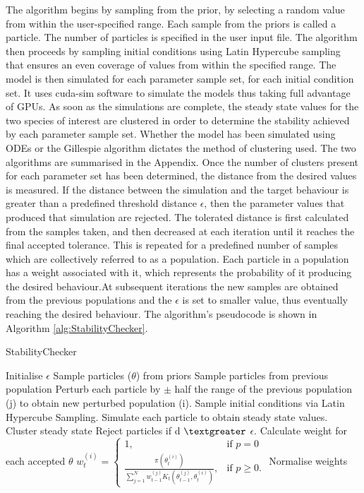  The algorithm begins by sampling from the prior, by selecting a random value from within the user-specified range. Each sample from the priors is called a particle. The number of particles is specified in the user input file. The algorithm then proceeds by sampling initial conditions using Latin Hypercube sampling that ensures an even coverage of values from within the specified range. The model is then simulated for each parameter sample set, for each initial condition set.  It uses cuda-sim software \autocite{Zhou:2011hp} to simulate the models thus taking full advantage of GPUs.  As soon as the simulations are complete, the steady state values for the two species of interest are clustered in order to determine the stability achieved by each parameter sample set. Whether the model has been simulated using ODEs or the Gillespie algorithm dictates the method of clustering used. The two algorithms are summarised in the Appendix. Once the number of clusters present for each parameter set has been determined, the distance from the desired values is measured. If the distance between the simulation and the target behaviour is greater than a predefined threshold distance $\epsilon$, then the parameter values that produced that simulation are rejected. The tolerated distance is first calculated from the samples taken, and then decreased at each iteration until it reaches the final accepted tolerance. This is repeated for a predefined number of samples which are collectively referred to as a population. Each particle in a population has a weight associated with it, which represents the probability of it producing the desired behaviour.At subsequent iterations the new samples are obtained from the previous populations and the $\epsilon$ is set to smaller value, thus eventually reaching the desired behaviour. The algorithm's pseudocode is shown in Algorithm \ref{alg:StabilityChecker}. 
\clearpage
\begin{algorithm}[ht]
	\label{alg:StabilityChecker}
  \caption{StabilityChecker}
 \begin{algorithmic}[1]
    \Statex
	\State Initialise $\epsilon$ 
		\State Sample particles ($\theta$) from priors
		\Else
			\State Sample particles from previous population
			\State Perturb each particle by $\pm$ half the range of the previous population (j) to obtain new perturbed population (i).
	\EndIf
	\State Sample initial conditions via Latin Hypercube Sampling.
    \State Simulate each particle to obtain steady state values.
    \State Cluster steady state
	\State Reject particles if d $\textgreater$ $\epsilon$.
    \State Calculate weight for each accepted $\theta$
	\State $w_{t}^{(i)} = \begin{cases} 1, & \mbox{if } p = 0 \\\frac{\pi(\theta_{t}^{(i)})}{\sum_{j=1}^N w_{t-1}^{(j)} K_{t}(\theta_{t-1}^{(j)}, \theta_{t}^{(i)})}, & \mbox{if } p \geq  0. \end{cases}$
	\State Normalise weights
	 
  \end{algorithmic}
\end{algorithm}

